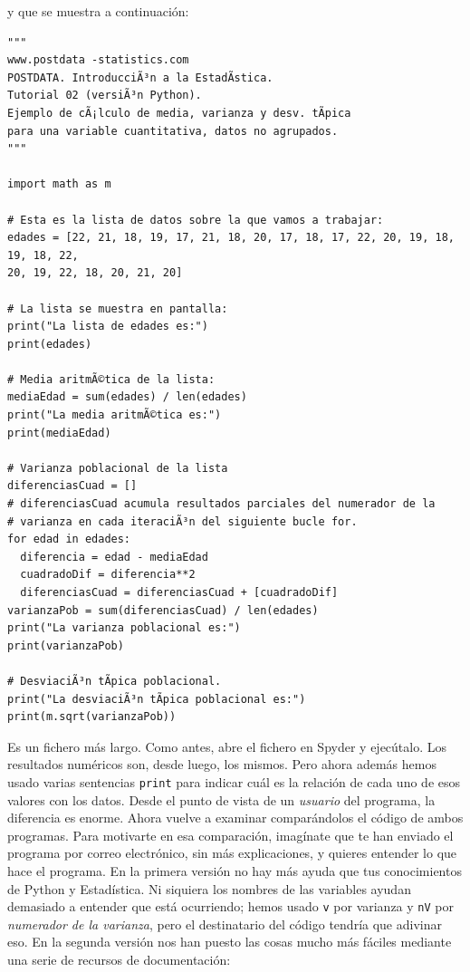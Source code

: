 \documentclass[10pt,a4paper]{article}\usepackage[]{graphicx}\usepackage[]{color}
\makeatletter
\newenvironment{kframe}{%
 \def\at@end@of@kframe{}%
 \ifinner\ifhmode%
  \def\at@end@of@kframe{\end{minipage}}%
  \begin{minipage}{\columnwidth}%
 \fi\fi%
 \def\FrameCommand##1{\hskip\@totalleftmargin \hskip-\fboxsep
 \colorbox{shadecolor}{##1}\hskip-\fboxsep
     \hskip-\linewidth \hskip-\@totalleftmargin \hskip\columnwidth}%
 \MakeFramed {\advance\hsize-\width
   \@totalleftmargin\z@ \linewidth\hsize
   \@setminipage}}%
 {\par\unskip\endMakeFramed%
 \at@end@of@kframe}
\newenvironment{knitrout}{}{} %
\newcounter {cont01}
\makeatother
\begin{document}
\begin{center}
\end{center}
y que se muestra a continuación:
\begin{knitrout}
\color{fgcolor}\begin{kframe}
\begin{verbatim}
"""
www.postdata -statistics.com
POSTDATA. IntroducciÃ³n a la EstadÃ­stica.
Tutorial 02 (versiÃ³n Python).
Ejemplo de cÃ¡lculo de media, varianza y desv. tÃ­pica
para una variable cuantitativa, datos no agrupados.
"""

import math as m

# Esta es la lista de datos sobre la que vamos a trabajar:
edades = [22, 21, 18, 19, 17, 21, 18, 20, 17, 18, 17, 22, 20, 19, 18, 19, 18, 22, 
20, 19, 22, 18, 20, 21, 20]

# La lista se muestra en pantalla:
print("La lista de edades es:")
print(edades)

# Media aritmÃ©tica de la lista:
mediaEdad = sum(edades) / len(edades)
print("La media aritmÃ©tica es:")
print(mediaEdad)

# Varianza poblacional de la lista
diferenciasCuad = []
# diferenciasCuad acumula resultados parciales del numerador de la 
# varianza en cada iteraciÃ³n del siguiente bucle for.
for edad in edades:
  diferencia = edad - mediaEdad
  cuadradoDif = diferencia**2
  diferenciasCuad = diferenciasCuad + [cuadradoDif]
varianzaPob = sum(diferenciasCuad) / len(edades)
print("La varianza poblacional es:")
print(varianzaPob)

# DesviaciÃ³n tÃ­pica poblacional.
print("La desviaciÃ³n tÃ­pica poblacional es:")
print(m.sqrt(varianzaPob))
\end{verbatim}
\end{kframe}
\end{knitrout}
Es un fichero más largo. Como antes, abre el fichero en Spyder y ejecútalo. Los resultados numéricos son, desde luego, los mismos. Pero ahora además hemos usado varias sentencias {\tt print} para indicar cuál es la relación de cada uno de esos valores con los datos. Desde el punto de vista de un {\em usuario} del programa, la diferencia es enorme. Ahora vuelve a examinar comparándolos el código de ambos programas. Para motivarte en esa comparación, imagínate que te han enviado el programa por correo electrónico, sin más explicaciones, y quieres entender lo que hace el programa. En la primera versión no hay más ayuda que tus conocimientos de Python y Estadística. Ni siquiera los nombres de las variables ayudan demasiado a entender que está ocurriendo; hemos usado {\tt v} por varianza y {\tt nV} por {\em numerador de la varianza}, pero el destinatario del código tendría que adivinar eso. En la segunda versión nos han puesto las cosas mucho más fáciles mediante una serie de recursos de documentación:
\end{document}
